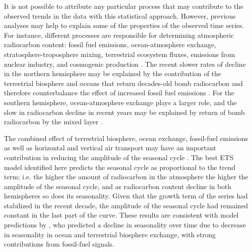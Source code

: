 \documentclass[a4paper, 11pt]{article}
\begin{document}
It is not possible to attribute any particular process that may contribute to the observed trends in the data with this statistical approach. However, previous analyses \citep{Caldeira1998GRL, Randerson2002GBC, Levin2013Tellus, Currie2011} may help to explain some of the properties of the observed time series. For instance, different processes are responsible for determining atmospheric radiocarbon content: fossil fuel emissions, ocean-atmosphere exchange, stratosphere-troposphere mixing, terrestrial ecosystem fluxes, emissions from nuclear industry, and cosmogenic production \citep{Oeschger1975Tellus, Randerson2002GBC, Naegler2006, Levin2010Tellus, Graven2015PNAS}. The recent slower rates of decline in the northern hemisphere may be explained by the contribution of the terrestrial biosphere and oceans that return decades-old bomb radiocarbon and therefore counterbalance the effect of increased fossil fuel emissions \citep{Caldeira1998GRL, Randerson2002GBC, Currie2011}. For the southern hemisphere, ocean-atmosphere exchange plays a larger role, and the slow in radiocarbon decline in recent years may be explained by return of bomb radiocarbon by the mixed layer \citep{Currie2011}.

The combined effect of terrestrial biosphere, ocean exchange, fossil-fuel emissions as well as horizontal and vertical air transport may have an important contribution in reducing the amplitude of the seasonal cycle \citep{Levin2010Tellus}. The best ETS model identified here predicts the seasonal cycle as proportional to the trend term; i.e. the higher the amount of radiocarbon in the atmosphere the higher the amplitude of the seasonal cycle, and as radiocarbon content decline in both hemispheres so does its seasonality. Given that the growth term of the series had stabilized in the recent decade, the amplitude of the seasonal cycle had remained constant in the last part of the curve. These results are consistent with model predictions by \citet{Randerson2002GBC}, who predicted a decline in seasonality over time due to decrease in seasonality in ocean and terrestrial biosphere exchange, with strong contributions from fossil-fuel signals. 
\end{document}
